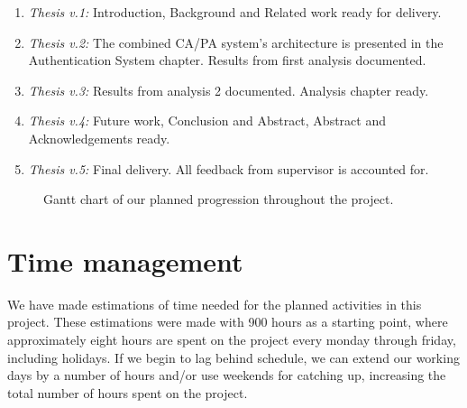 \documentclass[informationsecurity]{gucmasterproject}
\begin{document}
\begin{enumerate}
    \item \textit{Thesis v.1:} Introduction, Background and Related work ready for delivery.
    \item \textit{Thesis v.2:} The combined CA/PA system's architecture is presented in the Authentication System chapter. Results from first analysis documented.
    \item \textit{Thesis v.3:} Results from analysis 2 documented. Analysis chapter ready.
    \item \textit{Thesis v.4:} Future work, Conclusion and Abstract, Abstract and Acknowledgements ready.
    \item \textit{Thesis v.5:} Final delivery. All feedback from supervisor is accounted for.
\end{enumerate}


\begin{figure}[h]
    \centering
    \caption{Gantt chart of our planned progression throughout the project.}
    \label{fig:gantt}
\end{figure}


\section{Time management}
We have made estimations of time needed for the planned activities in this project.
These estimations were made with 900 hours as a starting point, where approximately eight hours are spent on the project every monday through friday, including holidays.
If we begin to lag behind schedule, we can extend our working days by a number of hours and/or use weekends for catching up, increasing the total number of hours spent on the project.
\end{document}

